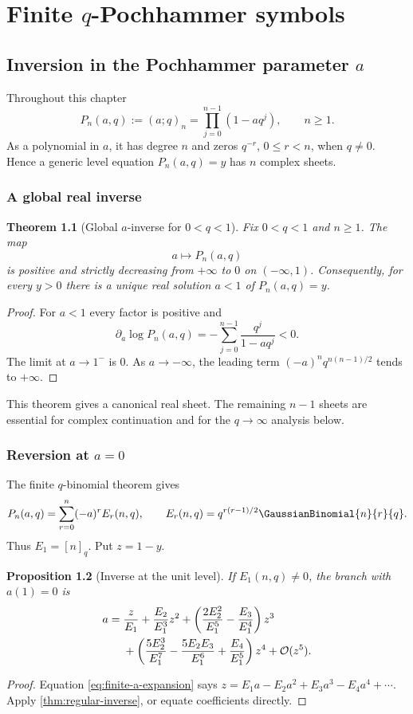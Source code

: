 \documentclass[11pt,oneside]{book}
\newtheorem{theorem}{Theorem}[chapter]
\newtheorem{proposition}[theorem]{Proposition}
\theoremstyle{definition}
\theoremstyle{remark}
\newcommand{\OO}{\mathcal{O}}
\begin{document}
\part{Finite $q$-Pochhammer symbols}

\chapter{Inversion in the Pochhammer parameter $a$}

Throughout this chapter
\[
 P_n(a,q):=(a;q)_n=\prod_{j=0}^{n-1}(1-aq^j),\qquad n\ge1.
\]
As a polynomial in $a$, it has degree $n$ and zeros $q^{-r}$,
$0\le r<n$, when $q\ne0$.  Hence a generic level equation
$P_n(a,q)=y$ has $n$ complex sheets.

\section{A global real inverse}
\begin{theorem}[Global $a$-inverse for $0<q<1$]\label{thm:global-a-finite}
Fix $0<q<1$ and $n\ge1$.  The map
\[
 a\longmapsto P_n(a,q)
\]
is positive and strictly decreasing from $+\infty$ to $0$ on
$(-\infty,1)$.  Consequently, for every $y>0$ there is a unique real solution
$a<1$ of $P_n(a,q)=y$.
\end{theorem}
\begin{proof}
For $a<1$ every factor is positive and
\[
 \partial_a\log P_n(a,q)
 =-\sum_{j=0}^{n-1}\frac{q^j}{1-aq^j}<0.
\]
The limit at $a\to1^-$ is $0$.  As $a\to-\infty$, the leading term
$(-a)^nq^{n(n-1)/2}$ tends to $+\infty$.
\end{proof}

This theorem gives a canonical real sheet.  The remaining $n-1$ sheets are
essential for complex continuation and for the $q\to\infty$ analysis below.

\section{Reversion at $a=0$}
The finite $q$-binomial theorem gives
\begin{equation}\label{eq:finite-a-expansion}
 P_n(a,q)=\sum_{r=0}^n(-a)^r E_r(n,q),
 \qquad E_r(n,q)=q^{r(r-1)/2}\GaussianBinomial{n}{r}{q}.
\end{equation}
Thus $E_1=[n]_q$.  Put $z=1-y$.

\begin{proposition}[Inverse at the unit level]\label{prop:a-inverse-zero}
If $E_1(n,q)\ne0$, the branch with $a(1)=0$ is
\begin{align}
 a={}&\frac{z}{E_1}+\frac{E_2}{E_1^3}z^2
 +\left(\frac{2E_2^2}{E_1^5}-\frac{E_3}{E_1^4}\right)z^3
 \notag\\
 &+\left(\frac{5E_2^3}{E_1^7}
 -\frac{5E_2E_3}{E_1^6}+\frac{E_4}{E_1^5}\right)z^4
 +\OO(z^5).\label{eq:a-inverse-zero}
\end{align}
\end{proposition}
\begin{proof}
Equation \eqref{eq:finite-a-expansion} says
$z=E_1a-E_2a^2+E_3a^3-E_4a^4+\cdots$.  Apply
\cref{thm:regular-inverse}, or equate coefficients directly.
\end{proof}
\end{document}
